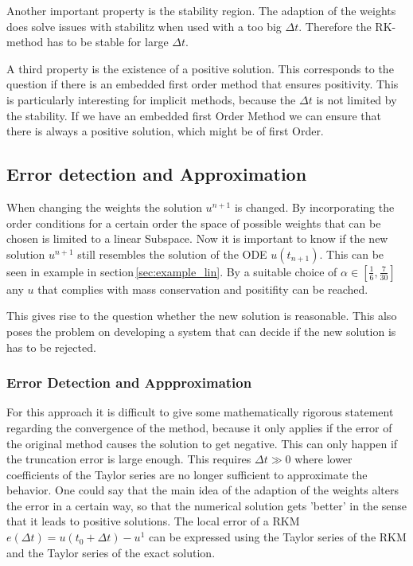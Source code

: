 \documentclass[a4paper]{scrartcl}
\numberwithin{equation}{section}
\theoremstyle{plain}
\theoremstyle{definition}
\numberwithin{theorem}{section}
\newcommand{\dt}{{\Delta t}}
\newcommand{\1}{\mathbbm{1}}
\begin{document}
Another important property is the stability region. The adaption of the weights does solve issues with stabilitz when used with a too big $\dt$. Therefore the RK-method has to be stable for large $\dt$.


A third property is the existence of a positive solution. This corresponds to the question if there is an embedded first order method that ensures positivity. This is particularly interesting for implicit methods, because the $\dt$ is not limited by the stability. 
If we have an embedded first Order Method we can ensure that there is always a positive solution, which might be of first Order. 

\subsection{Error detection and Approximation}
When changing the weights the solution $u^{n+1}$ is changed. 
By incorporating the order conditions for a certain order the space of possible weights that can be chosen is limited to a linear Subspace. 
Now it is important to know if the new solution $u^{n+1}$ still resembles the solution of the ODE $u(t_{n+1})$. 
This can be seen in example in section\,\ref{sec:example_lin}.
By a suitable choice of $\alpha \in [\frac{1}{6},\frac{7}{30}]$ any $u$ that complies with mass conservation and positifity can be reached. 

This gives rise to the question whether the new solution is reasonable.
This also poses the problem on developing a system that can decide if the new solution is has to be rejected. 
 
\subsubsection{Error Detection and Appproximation}
For this approach it is difficult to give some mathematically rigorous statement regarding the convergence of the method, because it only applies if the error of the original method causes the solution to get negative. This can only happen if the truncation error is large enough. This requires $\dt \gg 0$ where lower coefficients of the Taylor series are no longer sufficient to approximate the behavior. 
One could say that the main idea of the adaption of the weights alters the error in a certain way, so that the numerical solution gets 'better' in the sense that it leads to positive solutions. 
The local error of a RKM $e(\dt) =u(t_0 + \dt) - u^1$ can be expressed using the Taylor series of the RKM and the Taylor series of the exact solution. %
\end{document}
